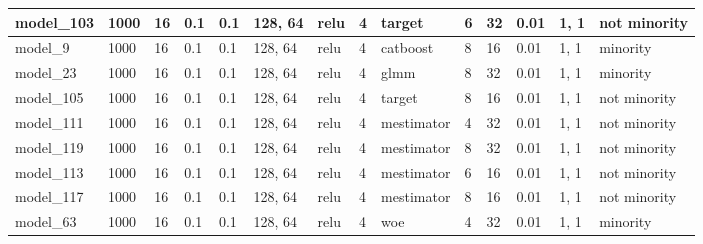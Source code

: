\begin{tabular}{|l|l|l|l|l|l|l|l|l|l|l|l|l|l|}
model\_103     & 1000           & 16           & 0.1          & 0.1          & 128, 64     & relu         & 4           & target            & 6                    & 32                    & 0.01                       & 1, 1             & not minority                \\ \hline
model\_9       & 1000           & 16           & 0.1          & 0.1          & 128, 64     & relu         & 4           & catboost          & 8                    & 16                    & 0.01                       & 1, 1             & minority                    \\ \hline
model\_23      & 1000           & 16           & 0.1          & 0.1          & 128, 64     & relu         & 4           & glmm              & 8                    & 32                    & 0.01                       & 1, 1             & minority                    \\ \hline
model\_105     & 1000           & 16           & 0.1          & 0.1          & 128, 64     & relu         & 4           & target            & 8                    & 16                    & 0.01                       & 1, 1             & not minority                \\ \hline
model\_111     & 1000           & 16           & 0.1          & 0.1          & 128, 64     & relu         & 4           & mestimator        & 4                    & 32                    & 0.01                       & 1, 1             & not minority                \\ \hline
model\_119     & 1000           & 16           & 0.1          & 0.1          & 128, 64     & relu         & 4           & mestimator        & 8                    & 32                    & 0.01                       & 1, 1             & not minority                \\ \hline
model\_113     & 1000           & 16           & 0.1          & 0.1          & 128, 64     & relu         & 4           & mestimator        & 6                    & 16                    & 0.01                       & 1, 1             & not minority                \\ \hline
model\_117     & 1000           & 16           & 0.1          & 0.1          & 128, 64     & relu         & 4           & mestimator        & 8                    & 16                    & 0.01                       & 1, 1             & not minority                \\ \hline
model\_63      & 1000           & 16           & 0.1          & 0.1          & 128, 64     & relu         & 4           & woe               & 4                    & 32                    & 0.01                       & 1, 1             & minority                    \\ \hline

\end{tabular}
